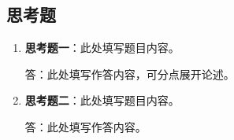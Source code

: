 \subsection{思考题}

\begin{enumerate}
    \item \textbf{思考题一}：此处填写题目内容。

          答：此处填写作答内容，可分点展开论述。
    \item \textbf{思考题二}：此处填写题目内容。

          答：此处填写作答内容。
\end{enumerate}